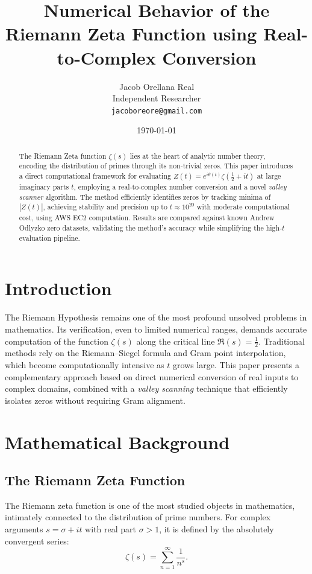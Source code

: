 \documentclass[11pt,a4paper]{article}
\title{\textbf{Numerical Behavior of the Riemann Zeta Function using Real-to-Complex Conversion}}
\author{Jacob Orellana Real\\
\small Independent Researcher\\
\small \texttt{jacoboreore@gmail.com}}
\date{\today}
\begin{document}
\maketitle

\begin{abstract}
The Riemann Zeta function $\zeta(s)$ lies at the heart of analytic number theory, encoding the distribution of primes through its non-trivial zeros. 
This paper introduces a direct computational framework for evaluating $Z(t) = e^{i\theta(t)}\zeta(\frac{1}{2}+it)$ at large imaginary parts $t$, employing a real-to-complex number conversion and a novel \emph{valley scanner} algorithm. 
The method efficiently identifies zeros by tracking minima of $|Z(t)|$, achieving stability and precision up to $t \approx 10^{20}$ with moderate computational cost, using AWS EC2 computation.
Results are compared against known Andrew Odlyzko zero datasets, validating the method’s accuracy while simplifying the high-$t$ evaluation pipeline.
\end{abstract}

\newpage
\tableofcontents

\newpage
\section{Introduction}
\label{sec:intro}
The Riemann Hypothesis remains one of the most profound unsolved problems in mathematics. 
Its verification, even to limited numerical ranges, demands accurate computation of the function $\zeta(s)$ along the critical line $\Re(s) = \tfrac{1}{2}$.
Traditional methods rely on the Riemann–Siegel formula and Gram point interpolation, which become computationally intensive as $t$ grows large.
This paper presents a complementary approach based on direct numerical conversion of real inputs to complex domains, combined with a \emph{valley scanning} technique that efficiently isolates zeros without requiring Gram alignment.

\section{Mathematical Background}
\label{sec:background}

\subsection{The Riemann Zeta Function}

The Riemann zeta function is one of the most studied objects in mathematics, intimately connected to the distribution of prime numbers.  
For complex arguments \( s = \sigma + it \) with real part \( \sigma > 1 \), it is defined by the absolutely convergent series:
\[
\zeta(s) = \sum_{n=1}^{\infty} \frac{1}{n^s}.
\]
\end{document}
